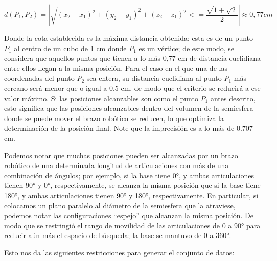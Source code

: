 \begin{equation}
	d(P_1, P_2) = |\sqrt{(x_2 - x_1)^2 + (y_2 - y_1)^2 + (z_2 - z_1)^2} <= \frac{\sqrt{1 + \sqrt{2}}}{2}| \approx 0,77 cm
\end{equation}

Donde la cota establecida es la máxima distancia obtenida; esta es de un punto $P_1$ al centro de un cubo de 1 cm donde $P_1$ es un vértice; de este modo, se considera que aquellos puntos que tienen a lo más 0,77 cm de distancia euclidiana entre ellos llegan a la misma posición. Para el caso en el que una de las coordenadas del punto $P_2$ sea entera, su distancia euclidiana al punto $P_1$ más cercano será menor que o igual a 0,5 cm, de modo que el criterio se reducirá a ese valor máximo. Si las posiciones alcanzables son como el punto $P_1$ antes descrito, esto significa que las posiciones alcanzables dentro del volumen de la semiesfera donde se puede mover el brazo robótico se reducen, lo que optimiza la determinación de la posición final. Note que la imprecisión es a lo más de 0.707 cm. 

Podemos notar que muchas posiciones pueden ser alcanzadas por un brazo robótico de una determinada longitud de articulaciones con más de una combinación de ángulos; por ejemplo, si la base tiene 0°, y ambas articulaciones tienen 90° y 0°, respectivamente, se alcanza la misma posición que si la base tiene 180°, y ambas articulaciones tienen 90° y 180°, respectivamente. En particular, si colocamos un plano paralelo al diámetro de la semiesfera que la atraviese, podemos notar las configuraciones ``espejo'' que alcanzan la misma posición. De modo que se restringió el rango de movilidad de las articulaciones de 0 a 90° para reducir aún más el espacio de búsqueda; la base se mantuvo de 0 a 360°. 


Esto nos da las siguientes restricciones para generar el conjunto de datos:

